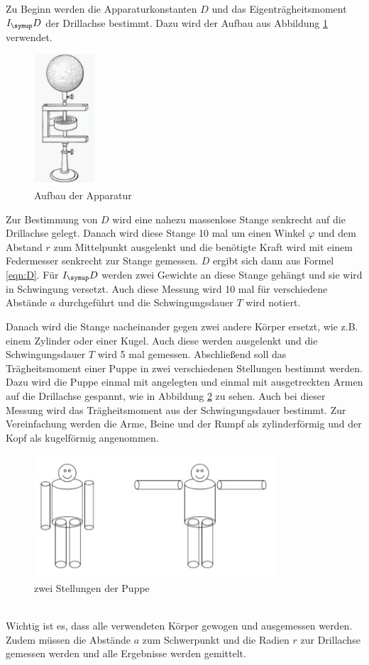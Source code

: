 Zu Beginn werden die Apparaturkonstanten $D$ und das Eigenträgheitsmoment $I_\su{D}$
der Drillachse bestimmt.
Dazu wird der Aufbau aus Abbildung \ref{fig:aufbau} verwendet.
\begin{figure}
  \centering
  \includegraphics[width=0.2\textwidth]{bilder/aufbau.jpg}
  \caption{Aufbau der Apparatur\,\cite{101}}
  \label{fig:aufbau}
\end{figure}
Zur Bestimmung von $D$ wird eine nahezu massenlose Stange senkrecht auf die Drillachse gelegt.
Danach wird diese Stange 10 mal um einen Winkel $\varphi$ und dem Abstand $r$
zum Mittelpunkt ausgelenkt und die benötigte Kraft wird mit einem Federmesser
senkrecht zur Stange gemessen. $D$ ergibt sich dann aus Formel \eqref{eqn:D}.
Für $I_\su{D}$ werden zwei Gewichte an diese Stange gehängt und sie wird in Schwingung
versetzt. Auch diese Messung wird 10 mal für verschiedene Abstände $a$ durchgeführt
und die Schwingungsdauer $T$ wird notiert.

Danach wird die Stange nacheinander gegen zwei andere Körper ersetzt, wie z.B.
einem Zylinder oder einer Kugel. Auch diese werden ausgelenkt und die Schwingungsdauer
$T$ wird 5 mal gemessen.
\newpage
Abschließend soll das Trägheitsmoment einer Puppe in zwei verschiedenen Stellungen
bestimmt werden. Dazu wird die Puppe einmal mit angelegten und einmal mit ausgetreckten
Armen auf die Drillachse gespannt, wie in Abbildung \ref{fig:puppe} zu sehen.
Auch bei dieser Messung wird das Trägheitsmoment aus
der Schwingungsdauer bestimmt. Zur Vereinfachung werden die Arme, Beine und der Rumpf
als zylinderförmig und der Kopf als kugelförmig angenommen.
\begin{figure}[!h]
  \centering
  \includegraphics[width=0.8\textwidth]{bilder/puppe.jpg}
  \caption{zwei Stellungen der Puppe\,\cite{101}}
  \label{fig:puppe}
\end{figure} \\
Wichtig ist es, dass alle verwendeten Körper gewogen und ausgemessen werden.
Zudem müssen die Abstände $a$ zum Schwerpunkt und die Radien $r$ zur Drillachse gemessen
werden und alle Ergebnisse werden gemittelt.
